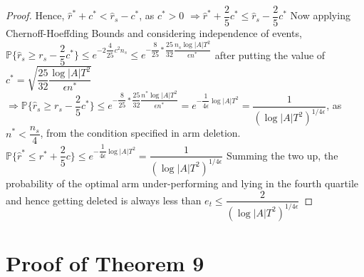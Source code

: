 \begin{proof}
\newline
Hence, $\hat{r}^{*}+c^{*} < \hat{r}_{s} - c^{*} $, as $c^{*}>0$
\newline
\hspace*{8em}$\Rightarrow \hat{r}^{*}+\dfrac{2}{5}c^{*} \leq \hat{r}_{s} - \dfrac{2}{5}c^{*} $
\newline
Now applying Chernoff-Hoeffding Bounds and considering independence of events,
\newline
\hspace*{8em}$\mathbb{P}\lbrace\hat{r}_{s} \geq r_{s} - \dfrac{2}{5}c^{*}\rbrace\leq e^{-2\dfrac{4}{25}c^{2}n_{s}} \leq e^{-\dfrac{8}{25}*\dfrac{25}{32}\dfrac{n_{s}\log{|A|T^{2}}}{\epsilon n^{*} }} $
\newline
after putting the value of $c^{*} =  \sqrt{\dfrac{25}{32}\dfrac{\log{|A|T^{2}}}{\epsilon n^{*}}}$
\newline
\hspace*{8em}$\Rightarrow \mathbb{P}\lbrace\hat{r}_{s} \geq r_{s} - \dfrac{2}{5}c^{*}\rbrace\leq  e^{-\dfrac{8}{25}*\dfrac{25}{32}\dfrac{n^{*}\log{|A|T^{2}}}{\epsilon n^{*} }} = e^{-\dfrac{1}{4\epsilon} \log{|A|T^{2}}}= \dfrac{1}{(\log |A|T^{2})^{1/4\epsilon}}$, as $n^{*}<\dfrac{n_{s}}{4}$, from the condition specified in arm deletion.
\newline
\hspace*{8em}$\mathbb{P} \lbrace \hat{r}^{*} \leq r^{*} + \dfrac{2}{5}c \rbrace \leq e^{-\dfrac{1}{4\epsilon} \log{|A|T^{2}}}= \dfrac{1}{(\log |A|T^{2})^{1/4\epsilon}}$
\newline
Summing the two up, the probability of the optimal arm under-performing and lying in the fourth quartile and hence getting deleted is always less than $e_{t}\leq \dfrac{2}{(\log |A|T^{2})^{1/4\epsilon}}$
\end{proof}

\section{Proof of Theorem 9}



